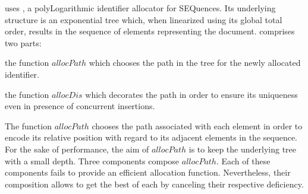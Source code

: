 \CRATE uses \LSEQ, a polyLogarithmic identifier allocator for SEQuences. Its
underlying structure is an exponential tree which, when linearized using its
global total order, results in the sequence of elements representing the
document. \LSEQ comprises two parts:
\begin{inparaenum}[(i)]
\item the function $allocPath$ which chooses the path in the tree for the
  newly allocated identifier.
\item the function $allocDis$ which decorates the path in order to ensure its
  uniqueness even in presence of concurrent insertions.
\end{inparaenum}

The function $allocPath$ chooses the path associated with each element in order
to encode its relative position with regard to its adjacent elements in the
sequence. For the sake of performance, the aim of $allocPath$ is to keep the
underlying tree with a small depth. Three components compose $allocPath$. Each
of these components fails to provide an efficient allocation
function. Nevertheless, their composition allows to get the best of each by
canceling their respective deficiency.
